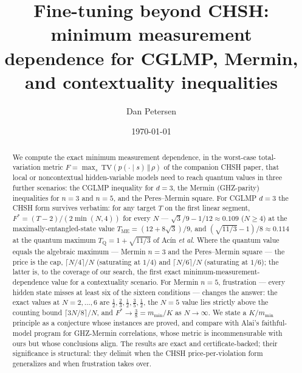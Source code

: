 \documentclass[aps,pra,reprint,superscriptaddress,floatfix]{revtex4-2}
\newcommand{\TV}{\mathrm{TV}}
\begin{document}
\title{Fine-tuning beyond {CHSH}: minimum measurement dependence for {CGLMP}, {Mermin}, and contextuality inequalities}
\author{Dan Petersen}
\noaffiliation

\date{\today}

\begin{abstract}
We compute the exact minimum measurement dependence, in the worst-case
total-variation metric $F=\max_{s}\,\TV(p(\cdot\mid s)\,\Vert\,\rho)$ of the
companion {CHSH} paper, that local or noncontextual hidden-variable models
need to reach quantum values in three further scenarios: the {CGLMP}
inequality for $d=3$, the {Mermin} (GHZ-parity) inequalities for $n=3$ and
$n=5$, and the Peres--Mermin square. For {CGLMP} $d=3$ the {CHSH} form
survives verbatim: for any target $T$ on the first linear segment,
$F^{*}=(T-2)/(2\min(N,4))$ for every $N$ --- $\sqrt3/9-1/12\approx0.109$
($N\ge4$) at the maximally-entangled-state value
$T_{\mathrm{ME}}=(12+8\sqrt3)/9$, and $(\sqrt{11/3}-1)/8\approx0.114$ at
the quantum maximum $T_{\mathrm{Q}}=1+\sqrt{11/3}$ of Ac\'in \emph{et al.}
Where the quantum value equals the algebraic maximum ---
{Mermin} $n=3$ and the Peres--Mermin square --- the price is the cap,
$\lceil N/4\rceil/N$ (saturating at $1/4$) and $\lceil N/6\rceil/N$
(saturating at $1/6$); the latter is, to the coverage of our search, the
first exact minimum-measurement-dependence value for a contextuality
scenario. For {Mermin} $n=5$, frustration --- every hidden state misses at
least six of the sixteen conditions --- changes the answer: the exact values
at $N=2,\dots,6$ are $\tfrac12,\tfrac23,\tfrac12,\tfrac35,\tfrac12$, the
$N=5$ value lies strictly above the counting bound $\lceil 3N/8\rceil/N$,
and $F^{*}\to\tfrac38=m_{\min}/K$ as $N\to\infty$. We state a $K/m_{\min}$
principle as a conjecture whose instances are proved, and compare with
Alai's faithful-model program for GHZ-{Mermin} correlations, whose metric
is incommensurable with ours but whose conclusions align. The results are
exact and certificate-backed; their significance is structural: they
delimit when the {CHSH} price-per-violation form generalizes and when
frustration takes over.
\end{abstract}


\maketitle
\end{document}
